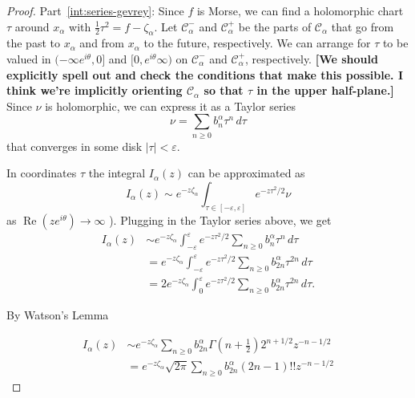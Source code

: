 \documentclass[11pt,a4paper,twoside,leqno,noamsfonts]{amsart}
\numberwithin{equation}{section}
\begin{document}
\begin{proof}
Part~\eqref{int:series-gevrey}: Since $f$ is Morse, we can find a holomorphic chart $\tau$ around $x_\alpha$ with $\tfrac{1}{2} \tau^2 = f - \zeta_\alpha$. Let $\mathcal{C}^-_\alpha$ and $\mathcal{C}^+_\alpha$ be the parts of $\mathcal{C}_\alpha$ that go from the past to $x_\alpha$ and from $x_\alpha$ to the future, respectively. We can arrange for $\tau$ to be valued in $(-\infty e^{i\theta}, 0]$ and $[0, e^{i\theta}\infty)$ on $\mathcal{C}^-_\alpha$ and $\mathcal{C}^+_\alpha$, respectively. \textbf{[We should explicitly spell out and check the conditions that make this possible. I think we're implicitly orienting $\mathcal{C}_\alpha$ so that $\tau$ in the upper half-plane.]} Since $\nu$ is holomorphic, we can express it as a Taylor series
\[ \nu = \sum_{n \ge 0} b_n^\alpha \tau^n\,d\tau \]
that converges in some disk $|\tau| < \varepsilon$.


In coordinates $\tau $ the integral $I_\alpha(z)$ can be approximated as 
\[ I_\alpha(z) \sim  e^{-z\zeta_\alpha}\int_{\tau \in [-\varepsilon, \varepsilon]} e^{-z\tau^2/2} \nu \]
as $\operatorname{Re}(ze^{i\theta}) \to \infty$ \cite[Lemma 1 in Section 19.2.2]{math-analysis-ii}). Plugging in the Taylor series above, we get
\begin{align*}
 I_\alpha(z) & \sim e^{-z\zeta_\alpha}\int_{-\varepsilon}^\varepsilon e^{-z\tau^2/2} \sum_{n \ge 0} b_n^\alpha \tau^n\,d\tau \\
& = e^{-z\zeta_\alpha}\int_{-\varepsilon}^\varepsilon e^{-z\tau^2/2} \sum_{n \ge 0} b_{2n}^\alpha \tau^{2n}\,d\tau\\
& = 2e^{-z\zeta_\alpha}\int_{0}^\varepsilon e^{-z\tau^2/2} \sum_{n \ge 0} b_{2n}^\alpha \tau^{2n}\,d\tau.
\end{align*}


By Watson's Lemma~\cite[Lemma 4, \S 19.2.2]{math-analysis-ii}

\begin{align*}
I_\alpha(z) &\sim e^{-z\zeta_\alpha}\sum_{n \ge 0} b_{2n}^\alpha \Gamma\left(n+\tfrac{1}{2}\right)2^{n+1/2}z^{-n-1/2}\\
&= e^{-z\zeta_\alpha}\sqrt{2\pi}\sum_{n \ge 0} b_{2n}^\alpha (2n-1)!!z^{-n-1/2}
\end{align*}




\end{proof}
\end{document}
